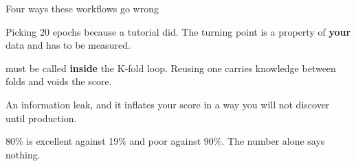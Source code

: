 \documentclass[aspectratio=169,11pt,t]{beamer}
\begin{document}
\begin{frame}[shrink=25]{Four ways these workflows go wrong}
\begin{minipage}[t]{0.494\textwidth}
\begin{icardbad}
Picking 20 epochs because a tutorial did. The turning point is a property of \textbf{your} data and has to be measured.
\end{icardbad}
\end{minipage}%
\hfill
\begin{minipage}[t]{0.494\textwidth}
\begin{icardbad}
 must be called \textbf{inside} the K-fold loop. Reusing one carries knowledge between folds and voids the score.
\end{icardbad}
\end{minipage}%


\vskip 4pt

\begin{minipage}[t]{0.494\textwidth}
\begin{icardbad}
An information leak, and it inflates your score in a way you will not discover until production.
\end{icardbad}
\end{minipage}%
\hfill
\begin{minipage}[t]{0.494\textwidth}
\begin{icardbad}
80\% is excellent against 19\% and poor against 90\%. The number alone says nothing.
\end{icardbad}
\end{minipage}%
\end{frame}
\end{document}
